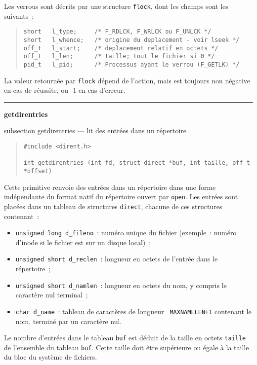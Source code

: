 \documentclass [twoside] {report}
\newcommand {\primitive} [1]
    {
	\phantomsection
	{\large \bf #1}
	\addcontentsline {toc} {subsection} {#1}
    }
\newcommand {\separation}
    {
	\vspace {5mm}
	\nopagebreak
	\hrule
    }
\begin{document}
Les verrous sont décrits par une structure {\tt flock}, dont les champs
sont les suivants~:

\begin {quote}
\begin {verbatim}
short   l_type;     /* F_RDLCK, F_WRLCK ou F_UNLCK */
short   l_whence;   /* origine du deplacement - voir lseek */
off_t   l_start;    /* deplacement relatif en octets */
off_t   l_len;      /* taille; tout le fichier si 0 */
pid_t   l_pid;      /* Processus ayant le verrou (F_GETLK) */
\end{verbatim}
\end {quote}

La valeur retournée par {\tt flock} dépend de l'action, mais est
toujours non négative en cas de réussite, ou
-1 en cas d'erreur.




\separation
\primitive {getdirentries} --- lit des entrées dans un répertoire

\begin {quote}
\begin {verbatim}
#include <dirent.h>

int getdirentries (int fd, struct direct *buf, int taille, off_t *offset)
\end{verbatim}
\end {quote}

Cette primitive renvoie des entrées dans un répertoire dans une
forme indépendante du format natif du répertoire ouvert par {\tt open}.
Les entrées sont placées dans un tableau de structures {\tt direct},
chacune de ces structures contenant~:

\begin {itemize}
    \item {\tt unsigned long d\_fileno}~:  numéro unique du fichier
	(exemple~:  numéro d'inode si le fichier est sur un disque
	local)~;
    \item {\tt unsigned short d\_reclen}~: longueur en octets de l'entrée
	dans le répertoire~;
    \item {\tt unsigned short d\_namlen}~: longueur en octets du nom, y
	compris le caractère nul terminal~;
    \item {\tt char d\_name}~: tableau de caractères de longueur {\tt
	MAXNAMELEN+1} contenant le nom, terminé par un caractère nul.

\end {itemize}

Le nombre d'entrées dans le tableau {\tt buf} est déduit de la taille en
octets {\tt taille} de l'ensemble du tableau {\tt buf}. Cette taille
doit être supérieure ou égale à la taille du bloc du système de
fichiers.
\end{document}
